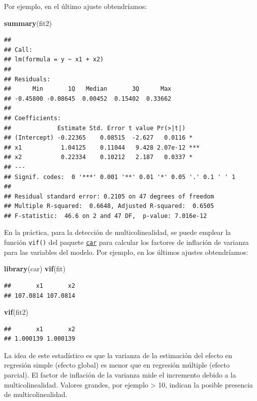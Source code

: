 \documentclass[
]{book}
\newenvironment{Shaded}{\begin{snugshade}}{\end{snugshade}}
\newcommand{\KeywordTok}[1]{\textcolor[rgb]{0.13,0.29,0.53}{\textbf{#1}}}
\newcommand{\NormalTok}[1]{#1}
\theoremstyle{break}
\theoremstyle{definition}
\theoremstyle{definition}
\theoremstyle{definition}
\theoremstyle{remark}
\begin{document}
Por ejemplo, en el último ajuste obtendríamos:

\begin{Shaded}
\begin{Highlighting}[]
\KeywordTok{summary}\NormalTok{(fit2)}
\end{Highlighting}
\end{Shaded}

\begin{verbatim}
## 
## Call:
## lm(formula = y ~ x1 + x2)
## 
## Residuals:
##      Min       1Q   Median       3Q      Max 
## -0.45800 -0.08645  0.00452  0.15402  0.33662 
## 
## Coefficients:
##             Estimate Std. Error t value Pr(>|t|)    
## (Intercept) -0.22365    0.08515  -2.627   0.0116 *  
## x1           1.04125    0.11044   9.428 2.07e-12 ***
## x2           0.22334    0.10212   2.187   0.0337 *  
## ---
## Signif. codes:  0 '***' 0.001 '**' 0.01 '*' 0.05 '.' 0.1 ' ' 1
## 
## Residual standard error: 0.2105 on 47 degrees of freedom
## Multiple R-squared:  0.6648, Adjusted R-squared:  0.6505 
## F-statistic:  46.6 on 2 and 47 DF,  p-value: 7.016e-12
\end{verbatim}

En la práctica, para la detección de multicolinealidad, se puede emplear la función
\texttt{vif()} del paquete \href{https://CRAN.R-project.org/package=car}{\texttt{car}} para calcular los factores de inflación de varianza para las variables del modelo.
Por ejemplo, en los últimos ajustes obtendríamos:

\begin{Shaded}
\begin{Highlighting}[]
\KeywordTok{library}\NormalTok{(car)}
\KeywordTok{vif}\NormalTok{(fit)}
\end{Highlighting}
\end{Shaded}

\begin{verbatim}
##       x1       x2 
## 107.0814 107.0814
\end{verbatim}

\begin{Shaded}
\begin{Highlighting}[]
\KeywordTok{vif}\NormalTok{(fit2) }
\end{Highlighting}
\end{Shaded}

\begin{verbatim}
##       x1       x2 
## 1.000139 1.000139
\end{verbatim}

La idea de este estadístico es que la varianza de la estimación del efecto en
regresión simple (efecto global) es menor que en regresión múltiple (efecto parcial).
El factor de inflación de la varianza mide el incremento debido a la multicolinealidad.
Valores grandes, por ejemplo \textgreater{} 10, indican la posible presencia de multicolinealidad.
\end{document}
